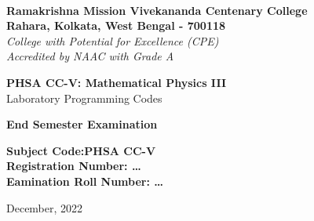 \begin{titlepage}
    \begin{center}
        \\
        \large\textbf{Ramakrishna Mission Vivekananda Centenary College}\\
        \normalsize\textbf{Rahara, Kolkata, West Bengal - 700118}\\
        \small\slshape College with Potential for Excellence (CPE)\\
        \small\normalfont Accredited by NAAC with Grade A

        \vfill

        \large\textbf{PHSA CC-V: Mathematical Physics III}\\
        \normalsize Laboratory Programming Codes



        \vfill

        \Large \textbf{End Semester Examination}\\

        \vspace{2em}

        \large
        \textbf{Subject Code:\hfill PHSA CC-V\\
                Registration Number: \hfill \dots\\
                Eamination Roll Number: \hfill \dots\\
        }
        
        \vfill

        \normalsize December, 2022
    \end{center}
\end{titlepage}